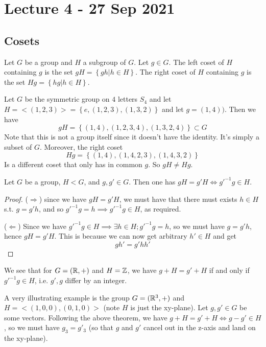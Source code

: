 \section{Lecture 4 - 27 Sep 2021}
\subsection{Cosets}
\begin{definition}
  Let $G$ be a group and $H$ a subgroup of $G$. Let $g\in G$. The left coset of $H$
  containing $g$ is the set $gH=\left\{ gh | h\in H \right\}$. The right coset of $H$
  containing $g$ is the set $Hg=\left\{ hg | h\in H \right\}$.
  \label{coset}
\end{definition}

\begin{ex}
  Let $G$ be the symmetric group on $4$ letters $S_4$ and let $H=<(1,2,3)>=\left\{
e,(1,2,3), (1,3,2) \right\}$ and let $g=(1,4))$. Then we have 
\[gH = \left\{ (1,4), (1,2,3,4), (1,3,2,4) \right\} \subset G\]
Note that this is not a group itself since it doesn't have the identity. It's simply a
subset of $G$. Moreover, the right coset
\[Hg = \left\{ (1,4), (1,4,2,3), (1,4,3,2) \right\}\]
Is a different coset that only has in common $g$. So $gH\neq Hg$.
\end{ex}

\begin{theorem}
  Let $G$ be a group, $H<G$, and $g,g'\in G$. Then one has $gH=g'H \iff g'^{-1}g\in H$.
\end{theorem}
\begin{proof}
  ($\Rightarrow$) since we have $gH=g'H$, we must have that there must
  exists $h\in H$ s.t. $g=g'h$, and so $g'^{-1}g=h \implies g'^{-1}g\in H$, as required.

  ($\Leftarrow$) Since we have $g'^{-1}g\in H \implies \exists h\in H ; g'^{-1}g =h$, so
  we must have $g=g' h$, hence $gH=g'H$. This is because we can now get arbitrary $h'\in
  H$ and get \[gh'=g'hh'\] 
\end{proof}

\begin{example}
  We see that for $G=(\mathbb R,+)$ and $H=\mathbb Z$, we have $g+H=g'+H$ if and only if
  $g'^{-1}g\in H$, i.e.  $g',g$ differ by an integer.
\end{example}
\begin{example}
  A very illustrating example is the group $G=(\mathbb R^3, +)$ and $H=<(1,0,0),(0,1,0)>$ (note
  $H$ is just the xy-plane). Let $g,g'\in G$ be some vectors. Following the above theorem,
  we have $g+H=g'+H \iff g-g'\in H$, so we must have $g_3=g'_3$ (so that $g$ and $g'$
    cancel out in the z-axis and land on the xy-plane).
\end{example}


